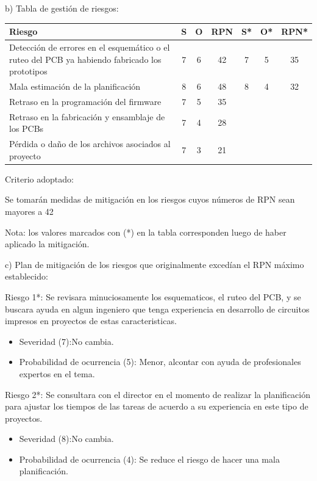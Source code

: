 \documentclass[
11pt, %
codirector, %
]{charter}
\begin{document}
b) Tabla de gestión de riesgos: 

\begin{table}[htpb]
\centering
\begin{tabularx}{\linewidth}{@{}|X|c|c|c|c|c|c|@{}}
\hline
\rowcolor[HTML]{C0C0C0} 
Riesgo & S & O & RPN & S* & O* & RPN* \\ \hline
Detección de errores en el esquemático o el ruteo del PCB ya habiendo fabricado los prototipos&   7&   6&     42&    7&    5&      35\\ \hline
Mala estimación de la planificación      &   8&   6&     48&    8&    4&      32\\ \hline
Retraso en la programación del firmware       &   7&   5&     35&    &    &      \\ \hline
Retraso en la fabricación y ensamblaje de los PCBs       &   7&   4&     28&    &    &      \\ \hline
Pérdida o daño de los archivos asociados al proyecto      &   7&   3&     21&    &    &      \\ \hline
\end{tabularx}%
\end{table}

Criterio adoptado: 

Se tomarán medidas de mitigación en los riesgos cuyos números de RPN sean mayores a 42

Nota: los valores marcados con (*) en la tabla corresponden luego de haber aplicado la mitigación.

c) Plan de mitigación de los riesgos que originalmente excedían el RPN máximo establecido:
 
Riesgo 1*: Se revisara minuciosamente los esquematicos, el ruteo del PCB, y se buscara ayuda en algun ingeniero que tenga experiencia en desarrollo de circuitos impresos en proyectos de estas caracteristicas.
  \begin{itemize}
	\item Severidad (7):No cambia.
	\item Probabilidad de ocurrencia (5): Menor, alcontar con ayuda de profesionales expertos en el tema.
\end{itemize}

Riesgo 2*: Se consultara con el director en el momento de realizar la planificación para ajustar los tiempos de las tareas de acuerdo a su experiencia en este tipo de proyectos.
  \begin{itemize}
	\item Severidad (8):No cambia.
	\item Probabilidad de ocurrencia (4): Se reduce el riesgo de hacer una mala planificación.
\end{itemize}
\end{document}

